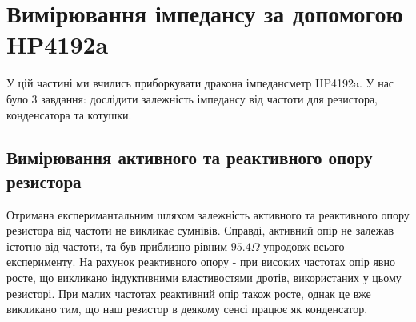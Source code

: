 \chapter{Вимірювання імпедансу за допомогою HP4192a} 
\label{chap:first}

У цій частині ми вчились приборкувати \sout{дракона} імпедансметр HP4192a. У нас було 3 завдання: дослідити залежність імпедансу від частоти для резистора, конденсатора та котушки.

\section{Вимірювання активного та реактивного опору резистора}

Отримана експеримантальним шляхом залежність активного та реактивного опору резистора від частоти не викликає сумнівів. Справді, активний опір не залежав істотно від частоти, та був приблизно рівним $95.4 \Omega$ упродовж всього експерименту. На рахунок реактивного опору - при високих частотах опір явно росте, що викликано індуктивними властивостями дротів, використаних у цьому резисторі. При малих частотах реактивний опір також росте, однак це вже викликано тим, що наш резистор в деякому сенсі працює як конденсатор.

